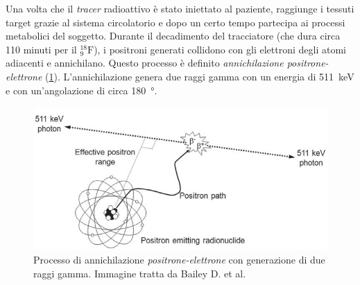 Una volta che il \textit{tracer} radioattivo è stato iniettato al paziente, raggiunge i tessuti target grazie al sistema circolatorio e dopo un certo tempo partecipa ai processi metabolici del soggetto. Durante il decadimento del tracciatore (che dura circa 110 minuti per il $^{18}_9\text{F}$), i positroni generati collidono con gli elettroni degli atomi adiacenti e annichilano. Questo processo è definito \textit{annichilazione positrone-elettrone} (\Fig\ref{fig:annihilation}). L'annichilazione genera due raggi gamma con un energia di \SI{511}{\kilo\electronvolt} e con un'angolazione di circa \SI{180}{\degree}.
\begin{figure}[h]
	\centering
	\includegraphics[width=0.8\linewidth]{./ImageFiles/annihilation}
	\caption{Processo di annichilazione \textit{positrone-elettrone} con generazione di due raggi gamma. Immagine tratta da Bailey D. et al\cite{Bailey2014}.}
	\label{fig:annihilation}
\end{figure}
